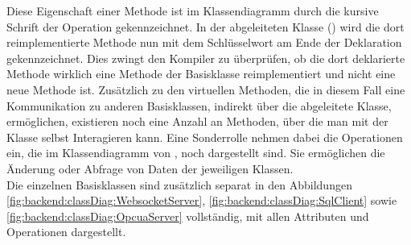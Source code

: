 Diese Eigenschaft einer Methode ist im Klassendiagramm durch die kursive Schrift der Operation gekennzeichnet.
In der abgeleiteten Klasse () wird die dort reimplementierte Methode nun mit dem Schlüsselwort  am Ende der Deklaration gekennzeichnet.
Dies zwingt den Kompiler zu überprüfen, ob die dort deklarierte Methode wirklich eine Methode der Basisklasse reimplementiert und nicht eine neue Methode ist.
Zusätzlich zu den virtuellen Methoden, die in diesem Fall eine Kommunikation zu anderen Basisklassen, indirekt über die abgeleitete Klasse, ermöglichen, existieren noch eine Anzahl an Methoden, 
über die man mit der Klasse selbst Interagieren kann.
Eine Sonderrolle nehmen dabei die Operationen ein, die im Klassendiagramm von , noch dargestellt sind.
Sie ermöglichen die Änderung oder Abfrage von Daten der jeweiligen Klassen.\\
Die einzelnen Basisklassen sind zusätzlich separat in den Abbildungen 
\ref{fig:backend:classDiag:WebsocketServer}, \ref{fig:backend:classDiag:SqlClient} sowie \ref{fig:backend:classDiag:OpcuaServer} 
vollständig, mit allen Attributen und Operationen dargestellt.


